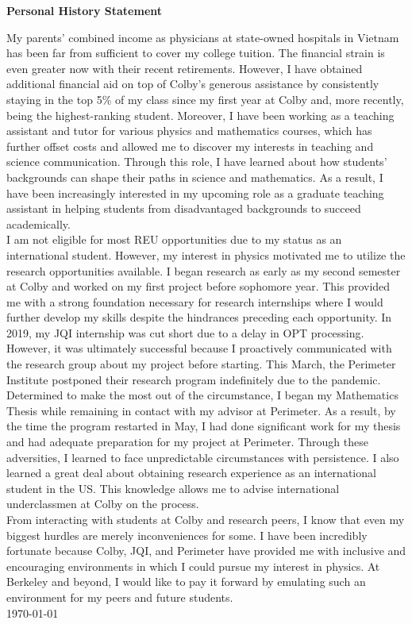 \documentclass[12pt]{article}
\begin{document}
\begin{center}
	\textbf{Personal History Statement}
\end{center}
My parents' combined income as physicians at state-owned hospitals in Vietnam has been far from sufficient to cover my college tuition. The financial strain is even greater now with their recent retirements. However,  I have obtained additional financial aid on top of Colby's generous assistance by consistently staying in the top 5\% of my class since my first year at Colby and, more recently, being the highest-ranking student. Moreover, I have been working as a teaching assistant and tutor for various physics and mathematics courses, which has further offset costs and allowed me to discover my interests in teaching and science communication. Through this role, I have learned about how students' backgrounds can shape their paths in science and mathematics. As a result, I have been increasingly interested in my upcoming role as a graduate teaching assistant in helping students from disadvantaged backgrounds to succeed academically. \\

I am not eligible for most REU opportunities due to my status as an international student. However, my interest in physics motivated me to utilize the research opportunities available. I began research as early as my second semester at Colby and worked on my first project before sophomore year. This provided me with a strong foundation necessary for research internships where I would further develop my skills despite the hindrances preceding each opportunity. In 2019, my JQI internship was cut short due to a delay in OPT processing. However, it was ultimately successful because I proactively communicated with the research group about my project before starting. This March, the Perimeter Institute postponed their research program indefinitely due to the pandemic. Determined to make the most out of the circumstance, I began my Mathematics Thesis while remaining in contact with my advisor at Perimeter. As a result, by the time the program restarted in May, I had done significant work for my thesis and had adequate preparation for my project at Perimeter. Through these adversities, I learned to face unpredictable circumstances with persistence. I also learned a great deal about obtaining research experience as an international student in the US. This knowledge allows me to advise international underclassmen at Colby on the process.\\

From interacting with students at Colby and research peers, I know that even my biggest hurdles are merely inconveniences for some. I have been incredibly fortunate because Colby, JQI, and Perimeter have provided me with inclusive and encouraging environments in which I could pursue my interest in physics. At Berkeley and beyond, I would like to pay it forward by emulating such an environment for my peers and future students.\\

\noindent \today
\end{document}
